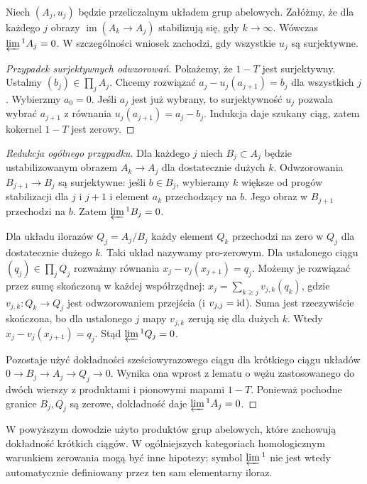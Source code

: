 \begin{twierdzenie}
\label{thm:xviii-ml}
Niech $(A_j,u_j)$ będzie przeliczalnym układem grup abelowych.
Załóżmy, że dla każdego $j$ obrazy
$\operatorname{im}(A_k\to A_j)$ stabilizują się, gdy $k\to\infty$.
Wówczas $\varprojlim{}^1 A_j=0$.
W szczególności wniosek zachodzi, gdy wszystkie $u_j$ są surjektywne.
\end{twierdzenie}
\begin{proof}[Przypadek surjektywnych odwzorowań]
Pokażemy, że $1-T$ jest surjektywny. Ustalmy
$(b_j)\in\prod_jA_j$. Chcemy rozwiązać
$a_j-u_j(a_{j+1})=b_j$ dla wszystkich $j$.
Wybierzmy $a_0=0$. Jeśli $a_j$ jest już wybrany, to
surjektywność $u_j$ pozwala wybrać $a_{j+1}$ z równania
$u_j(a_{j+1})=a_j-b_j$. Indukcja daje szukany ciąg,
zatem kokernel $1-T$ jest zerowy.
\end{proof}
\begin{proof}[Redukcja ogólnego przypadku]
Dla każdego $j$ niech $B_j\subset A_j$ będzie ustabilizowanym
obrazem $A_k\to A_j$ dla dostatecznie dużych $k$.
Odwzorowania $B_{j+1}\to B_j$ są surjektywne: jeśli
$b\in B_j$, wybieramy $k$ większe od progów stabilizacji dla
$j$ i $j+1$ i element $a_k$ przechodzący na $b$. Jego obraz
w $B_{j+1}$ przechodzi na $b$. Zatem $\varprojlim{}^1 B_j=0$.

Dla układu ilorazów $Q_j=A_j/B_j$ każdy element $Q_k$
przechodzi na zero w $Q_j$ dla dostatecznie dużego $k$.
Taki układ nazywamy pro-zerowym. Dla ustalonego ciągu
$(q_j)\in\prod_j Q_j$ rozważmy równania
$x_j-v_j(x_{j+1})=q_j$. Możemy je rozwiązać przez sumę
skończoną w każdej współrzędnej:
$x_j=\sum_{k\ge j}v_{j,k}(q_k)$, gdzie
$v_{j,k}:Q_k\to Q_j$ jest odwzorowaniem przejścia
(i $v_{j,j}=\mathrm{id}$). Suma jest rzeczywiście skończona,
bo dla ustalonego $j$ mapy $v_{j,k}$ zerują się dla dużych $k$.
Wtedy $x_j-v_j(x_{j+1})=q_j$. Stąd $\varprojlim{}^1Q_j=0$.

Pozostaje użyć dokładności sześciowyrazowego ciągu dla
krótkiego ciągu układów $0\to B_j\to A_j\to Q_j\to0$.
Wynika ona wprost z lematu o wężu zastosowanego do
dwóch wierszy z produktami i pionowymi mapami $1-T$.
Ponieważ pochodne granice $B_j,Q_j$ są zerowe,
dokładność daje $\varprojlim{}^1A_j=0$.
\end{proof}
\begin{uwaga}
W powyższym dowodzie użyto produktów grup abelowych,
które zachowują dokładność krótkich ciągów. W ogólniejszych
kategoriach homologicznym warunkiem zerowania mogą być inne
hipotezy; symbol $\varprojlim{}^1$ nie jest wtedy automatycznie
definiowany przez ten sam elementarny iloraz.
\end{uwaga}

